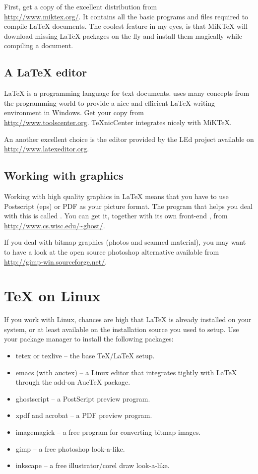 First, get a copy of the excellent  distribution from\\
\url{http://www.miktex.org/}. It contains all the basic programs and files
required to compile \LaTeX{} documents.  The coolest feature in my eyes, is
that MiKTeX will download missing \LaTeX{} packages on the fly and install them
magically while compiling a document.

\subsection{A \LaTeX{} editor}

\LaTeX{} is a programming language for text documents. 
uses many concepts from the programming-world to provide a nice and
efficient \LaTeX{} writing environment in Windows. Get your copy from\\
\url{http://www.toolscenter.org}. TeXnicCenter integrates nicely with
MiKTeX.

An another excellent choice is the editor provided by the LEd project available on
\url{http://www.latexeditor.org}.

\subsection{Working with graphics}

Working with high quality graphics in \LaTeX{} means that you have to use
Postscript (eps) or PDF as your picture format. The program that helps you
deal with this is called . You can get it, together with its
own front-end , from \url{http://www.cs.wisc.edu/~ghost/}.

If you deal with bitmap graphics (photos and scanned material), you may want
to have a look at the open source photoshop alternative  available
from \url{http://gimp-win.sourceforge.net/}.

\section{\TeX{} on Linux}

If you work with Linux, chances are high that \LaTeX{} is already installed
on your system, or at least available on the installation source you used to
setup. Use your package manager to install the following packages:

\begin{itemize}
\item tetex or texlive -- the base \TeX{}/\LaTeX{} setup.
\item emacs (with auctex) -- a Linux editor that integrates tightly with \LaTeX{} through the add-on AucTeX package.
\item ghostscript -- a PostScript preview program.
\item xpdf and acrobat -- a PDF preview program.
\item imagemagick -- a free program for converting bitmap images.
\item gimp -- a free photoshop look-a-like.
\item inkscape -- a free illustrator/corel draw look-a-like.
\end{itemize}

